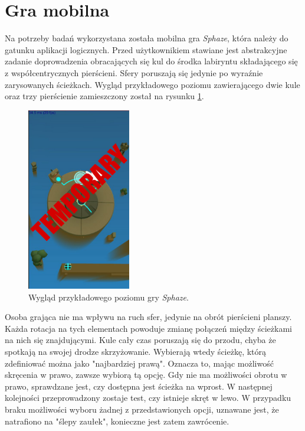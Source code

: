 \documentclass[a4paper,12pt,numbers=noenddot]{report}
\begin{document}
\section{Gra mobilna}
Na potrzeby badań wykorzystana została mobilna gra \textit{Sphaze}, która należy do gatunku aplikacji logicznych. Przed użytkownikiem stawiane jest abstrakcyjne zadanie doprowadzenia obracających się kul do środka labiryntu składającego się z współcentrycznych pierścieni. Sfery poruszają się jedynie po wyraźnie zarysowanych ścieżkach. Wygląd przykładowego poziomu zawierającego dwie kule oraz trzy pierścienie zamieszczony został na rysunku \ref{fig:sphaze_1}.

\begin{figure}[h!]
	\centering
  	\includegraphics[height=8cm]{fig/tmp.jpg}
	\caption{Wygląd przykładowego poziomu gry \textit{Sphaze}.}
	\label{fig:sphaze_1}
\end{figure}

Osoba grająca nie ma wpływu na ruch sfer, jedynie na obrót pierścieni planszy. Każda rotacja na tych elementach powoduje zmianę połączeń między ścieżkami na nich się znajdującymi. Kule cały czas poruszają się do przodu, chyba że spotkają na swojej drodze skrzyżowanie. Wybierają wtedy ścieżkę, którą zdefiniować można jako "najbardziej prawą". Oznacza to, mając możliwość skręcenia w prawo, zawsze wybiorą tą opcję. Gdy nie ma możliwości obrotu w prawo, sprawdzane jest, czy dostępna jest ścieżka na wprost. W następnej kolejności przeprowadzony zostaje test, czy istnieje skręt w lewo. W przypadku braku możliwości wyboru żadnej z przedstawionych opcji, uznawane jest, że natrafiono na "ślepy zaułek", konieczne jest zatem zawrócenie.
\end{document}
